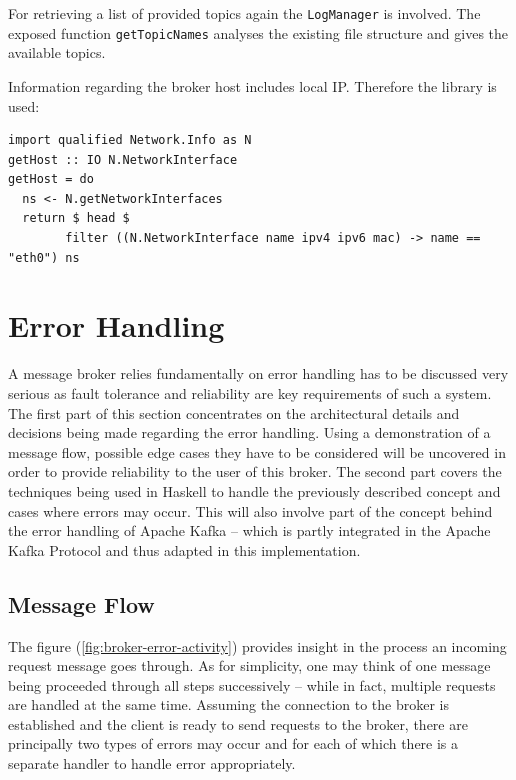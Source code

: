 For retrieving a list of provided topics again the \lstinline{LogManager} is
involved. The exposed function \lstinline{getTopicNames} analyses the existing
file structure and gives the available topics.

Information regarding the broker host includes local IP. Therefore the library
 is used: 

\begin{lstlisting}[caption={Get broker's host adress}]
import qualified Network.Info as N
getHost :: IO N.NetworkInterface
getHost = do
  ns <- N.getNetworkInterfaces
  return $ head $ 
        filter ((N.NetworkInterface name ipv4 ipv6 mac) -> name == "eth0") ns
\end{lstlisting}

\newpage
\section{Error Handling}
\label{sec:broker-error-handling}

A message broker relies fundamentally on error handling has to be discussed very
serious as fault tolerance and reliability are key requirements of such a
system. The first part of this section concentrates on the architectural details
and decisions being made regarding the error handling. Using a demonstration of
a message flow, possible edge cases they have to be considered will be uncovered
in order to provide reliability to the user of this broker. The second part
covers the techniques being used in Haskell to handle the previously described
concept and cases where errors may occur. This will also involve part of the
concept behind the error handling of Apache Kafka -- which is partly integrated
in the Apache Kafka Protocol and thus adapted in this implementation.

\subsection{Message Flow}

The figure (\ref{fig:broker-error-activity}) provides insight in the process an
incoming request message goes through. As for simplicity, one may think of one
message being proceeded through all steps successively -- while in fact,
multiple requests are handled at the same time. Assuming the connection to the
broker is established and the client is ready to send requests to the broker,
there are principally two types of errors may occur and for each of which there
is a separate handler to handle error appropriately.

